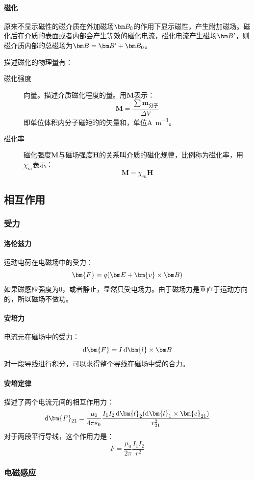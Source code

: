 \paragraph*{磁化}
原来不显示磁性的磁介质在外加磁场$\bB_0$的作用下显示磁性，产生附加磁场。磁化后在介质的表面或者内部会产生等效的磁化电流，磁化电流产生磁场$\bB'$，则磁介质内部的总磁场为$\bB=\bB'+\bB_0$。

描述磁化的物理量有：
\begin{description}
\item[磁化强度] 向量。描述介质磁化程度的量。用$\bm{M}$表示：
$$\bm{M}=\frac{\sum \bm{m}_{\text{分子}}}{\Delta V}$$
即单位体积内分子磁矩的的矢量和，单位\si{\ampere\per\m}。
\item[磁化率] 磁化强度$\bm{M}$与磁场强度$\bm{H}$的关系叫介质的磁化规律，比例称为磁化率，用$\chi_m$表示：
$$\bm{M}=\chi_m\bm{H}$$
\end{description}

\subsection{相互作用}
\subsubsection{受力}
\paragraph*{洛伦兹力}运动电荷在电磁场中的受力：
$$\bm{F}=q(\bE+\bm{v}\times \bB)$$
如果磁感应强度为0，或者静止，显然只受电场力。由于磁场力是垂直于运动方向的，所以磁场不做功。

\paragraph*{安培力}电流元在磁场中的受力：
$$\dif \bm{F}=I\dif\bm{l}\times\bB$$
对一段导线进行积分，可以求得整个导线在磁场中受的合力。

\paragraph*{安培定律}描述了两个电流元间的相互作用力：
$$\dif \bm{F}_{21}=\frac{\mu_0}{4\pi\varepsilon_0}\frac{I_1I_2\dif\bm{l}_2(\dif \bm{l}_1\times\bm{e}_{21})}{r_{21}^2}$$
对于两段平行导线，这个作用力是：
$$F=\frac{\mu_0}{2\pi}\frac{I_1I_2}{r^2}$$

\subsubsection{电磁感应}
